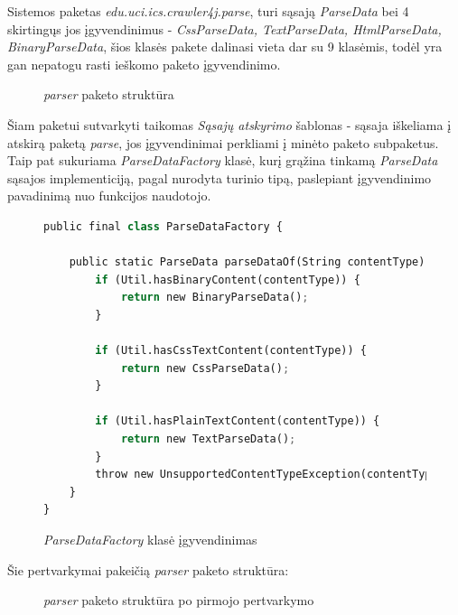 Sistemos paketas \textit{edu.uci.ics.crawler4j.parse}, turi sąsają \textit{ParseData} bei 4 skirtingųs jos įgyvendinimus - \textit{CssParseData, TextParseData, HtmlParseData, BinaryParseData},
šios klasės pakete dalinasi vieta dar su 9 klasėmis, todėl yra gan nepatogu rasti ieškomo paketo įgyvendinimo.
\begin{figure}[H]
    \snugshade
    \endsnugshade
    \caption{\textit{parser} paketo struktūra}
\end{figure}
Šiam paketui sutvarkyti taikomas \textit{Sąsajų atskyrimo} šablonas - sąsaja iškeliama į atskirą paketą \textit{parse}, jos įgyvendinimai perkliami į minėto
paketo subpaketus.
Taip pat sukuriama \textit{ParseDataFactory} klasė, kurį grąžina tinkamą \textit{ParseData} sąsajos implementiciją, pagal nurodyta turinio tipą, paslepiant įgyvendinimo pavadinimą nuo
funkcijos naudotojo.
\begin{figure}[H]
    \begin{lstlisting}[language=Python]
public final class ParseDataFactory {

    public static ParseData parseDataOf(String contentType) {
        if (Util.hasBinaryContent(contentType)) {
            return new BinaryParseData();
        }

        if (Util.hasCssTextContent(contentType)) {
            return new CssParseData();
        }

        if (Util.hasPlainTextContent(contentType)) {
            return new TextParseData();
        }
        throw new UnsupportedContentTypeException(contentType);
    }
}
    \end{lstlisting}
    \caption{\textit{ParseDataFactory} klasė įgyvendinimas }
\end{figure}
Šie pertvarkymai pakeičią \textit{parser} paketo struktūra:
\begin{figure}[H]
    \snugshade
    \endsnugshade
    \caption{\textit{parser} paketo struktūra po pirmojo pertvarkymo}
\end{figure}
